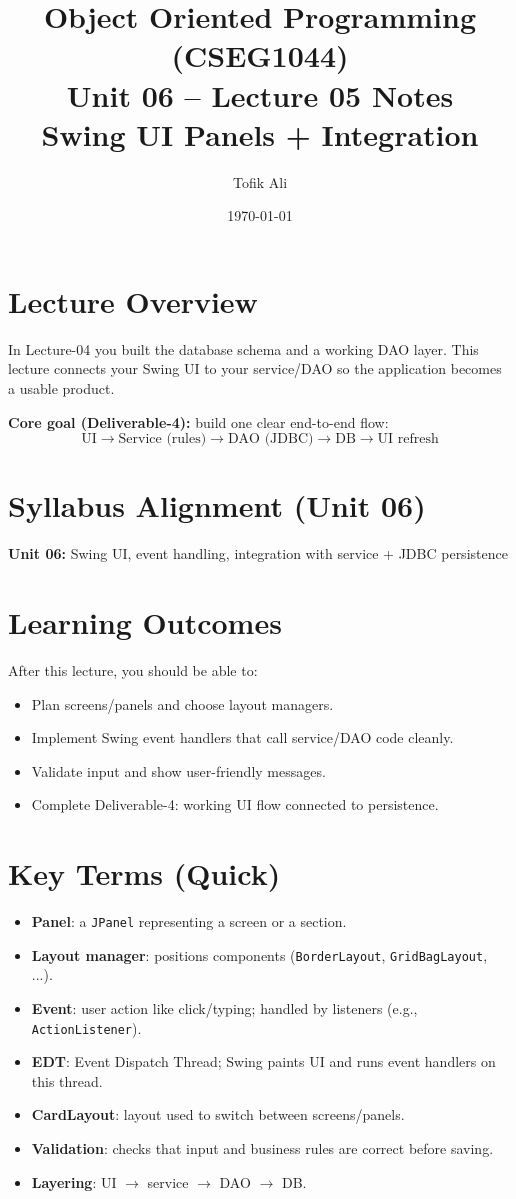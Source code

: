 \documentclass[11pt]{article}
\title{Object Oriented Programming (CSEG1044)\\Unit 06 -- Lecture 05 Notes\\Swing UI Panels + Integration}
\author{Tofik Ali}
\date{\today}
\begin{document}
\maketitle
\tableofcontents

\section{Lecture Overview}
In Lecture-04 you built the database schema and a working DAO layer.
This lecture connects your Swing UI to your service/DAO so the application becomes a usable product.

\textbf{Core goal (Deliverable-4):} build one clear end-to-end flow:
\[
\text{UI} \rightarrow \text{Service (rules)} \rightarrow \text{DAO (JDBC)} \rightarrow \text{DB}
\rightarrow \text{UI refresh}
\]
\notesources{\OOPSUnitVISources}

\section{Syllabus Alignment (Unit 06)}
\textbf{Unit 06:} Swing UI, event handling, integration with service + JDBC persistence

\section{Learning Outcomes}
After this lecture, you should be able to:
\begin{itemize}
  \item Plan screens/panels and choose layout managers.
  \item Implement Swing event handlers that call service/DAO code cleanly.
  \item Validate input and show user-friendly messages.
  \item Complete Deliverable-4: working UI flow connected to persistence.
\end{itemize}

\section{Key Terms (Quick)}
\begin{itemize}
  \item \textbf{Panel}: a \texttt{JPanel} representing a screen or a section.
  \item \textbf{Layout manager}: positions components (\texttt{BorderLayout}, \texttt{GridBagLayout}, ...).
  \item \textbf{Event}: user action like click/typing; handled by listeners (e.g., \texttt{ActionListener}).
  \item \textbf{EDT}: Event Dispatch Thread; Swing paints UI and runs event handlers on this thread.
  \item \textbf{CardLayout}: layout used to switch between screens/panels.
  \item \textbf{Validation}: checks that input and business rules are correct before saving.
  \item \textbf{Layering}: UI $\rightarrow$ service $\rightarrow$ DAO $\rightarrow$ DB.
\end{itemize}
\end{document}
